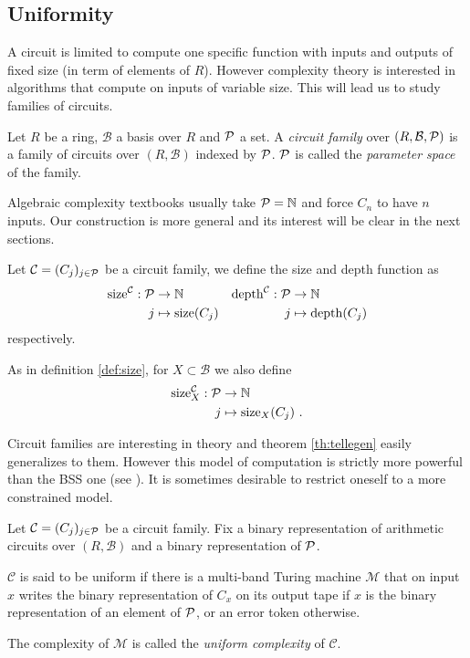 \subsection{Uniformity}
\label{sec:uniformity}

A circuit is limited to compute one specific function with inputs and
outputs of fixed size (in term of elements of $R$). However complexity
theory is interested in algorithms that compute on inputs of variable
size. This will lead us to study families of circuits.

\begin{definition}
  Let $R$ be a ring, $\mathcal{B}$ a basis over $R$ and $\mathcal{P}$ a
  set. A \emph{circuit family} over $(R,\mathcal{B},\mathcal{P})$ is a
  family of circuits over $(R,\mathcal{B})$ indexed by $\mathcal{P}$.
  $\mathcal{P}$ is called the \emph{parameter space} of the family.
\end{definition}

Algebraic complexity textbooks usually take $\mathcal{P}=\mathbb{N}$ and force
$C_n$ to have $n$ inputs. Our construction is more general and its
interest will be clear in the next sections.

\begin{definition}
  Let $\mathcal{C} = (C_j)_{j\in\mathcal{P}}$ be a circuit family, we
  define the size and depth function as
  \begin{align*}
    \operatorname{size}^{\mathcal{C}}:\mathcal{P}&\rightarrow\mathbb{N}  & \operatorname{depth}^{\mathcal{C}}:\mathcal{P}&\rightarrow\mathbb{N}\\
                   j&\mapsto\operatorname{size}(C_j) &    j&\mapsto\operatorname{depth}(C_j)
  \end{align*}
  respectively.

  As in definition \ref{def:size}, for $X\subset\mathcal{B}$ we also
  define
  \begin{align*}
    \operatorname{size}^{\mathcal{C}}_X:\mathcal{P}&\rightarrow\mathbb{N}\\
                     j&\mapsto\operatorname{size}_X(C_j)
                     \text{ .}
  \end{align*}
\end{definition}

Circuit families are interesting in theory and theorem
\ref{th:tellegen} easily generalizes to them. However this model of
computation is strictly more powerful than the BSS one (see \cite[Obs.
2.3]{Vollmer}). It is sometimes desirable to restrict oneself to a
more constrained model.

\begin{definition}
  Let $\mathcal{C} = (C_j)_{j\in\mathcal{P}}$ be a circuit family. Fix a
  binary representation of arithmetic circuits over $(R,\mathcal{B})$
  and a binary representation of $\mathcal{P}$.

  $\mathcal{C}$ is said to be uniform if there is a multi-band Turing
  machine $\mathcal{M}$ that on input $x$ writes the binary
  representation of $C_x$ on its output tape if $x$ is the binary
  representation of an element of $\mathcal{P}$, or an error token otherwise.

  The complexity of $\mathcal{M}$ is called the \emph{uniform
    complexity} of $\mathcal{C}$.
\end{definition}

